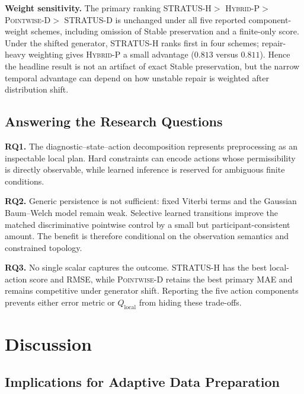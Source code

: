 \documentclass[sigconf,review]{acmart}
\newcommand{\methodP}{\textsc{Pointwise-D}\xspace}
\newcommand{\methodD}{\textsc{STRATUS-D}\xspace}
\newcommand{\methodHP}{\textsc{Hybrid-P}\xspace}
\newcommand{\methodH}{\textsc{STRATUS-H}\xspace}
\begin{document}
\textbf{Weight sensitivity.} The primary ranking \methodH $>$ \methodHP $>$ \methodP $>$ \methodD is unchanged under all five reported component-weight schemes, including omission of Stable preservation and a finite-only score. Under the shifted generator, \methodH ranks first in four schemes; repair-heavy weighting gives \methodHP a small advantage ($0.813$ versus $0.811$). Hence the headline result is not an artifact of exact Stable preservation, but the narrow temporal advantage can depend on how unstable repair is weighted after distribution shift.



\subsection{Answering the Research Questions}

\textbf{RQ1.} The diagnostic--state--action decomposition represents preprocessing as an inspectable local plan. Hard constraints can encode actions whose permissibility is directly observable, while learned inference is reserved for ambiguous finite conditions.

\textbf{RQ2.} Generic persistence is not sufficient: fixed Viterbi terms and the Gaussian Baum--Welch model remain weak. Selective learned transitions improve the matched discriminative pointwise control by a small but participant-consistent amount. The benefit is therefore conditional on the observation semantics and constrained topology.

\textbf{RQ3.} No single scalar captures the outcome. \methodH has the best local-action score and RMSE, while \methodP retains the best primary MAE and remains competitive under generator shift. Reporting the five action components prevents either error metric or $Q_{\mathrm{local}}$ from hiding these trade-offs.

\section{Discussion}
\label{sec:discussion}

\subsection{Implications for Adaptive Data Preparation}
\end{document}

